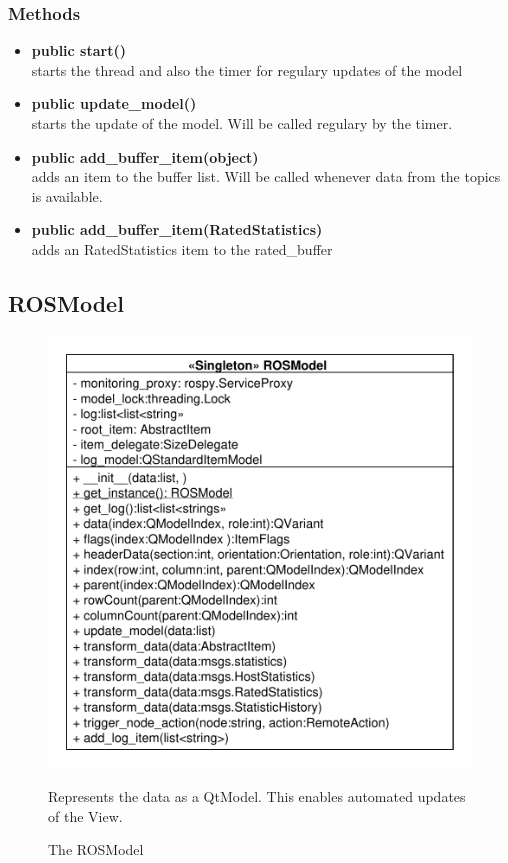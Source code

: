 \subsubsection{Methods}
\begin{itemize}
  \item \textbf{public start()}\\
  starts the thread and also the timer for regulary updates of the model
  \item \textbf{public update\_model()}\\ 
  starts the update of the model. Will be called regulary by the timer.
  \item \textbf{public add\_buffer\_item(object)}\\ 
  adds an item to the buffer list. Will be called whenever data from the topics
  is available.
  \item \textbf{public add\_buffer\_item(RatedStatistics)}\\
  adds an RatedStatistics item to the rated\_buffer
\end{itemize}

\subsection{ROSModel}
\begin{figure}[htbp]
	\begin{minipage}[t]{7cm}
		\vspace{0pt}
		\centering
		\includegraphics[scale=0.6]{./diagram_pictures/ROSModel.pdf}
		\caption{The ROSModel}
	\end{minipage}
	\hfill
	\begin{minipage}[t]{6cm}
		\vspace{10pt}		
		Represents the data as a QtModel. This enables automated updates of the View.
	\end{minipage}
\end{figure}
